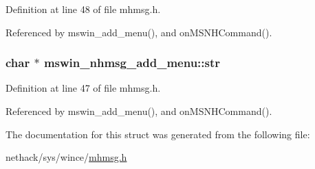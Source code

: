 Definition at line 48 of file mhmsg.\+h.



Referenced by mswin\+\_\+add\+\_\+menu(), and on\+M\+S\+N\+H\+Command().

\hypertarget{structmswin__nhmsg__add__menu_affef89042e33c9d34265eadc957330d6}{
\subsubsection[{str}]{ char $\ast$ mswin\+\_\+nhmsg\+\_\+add\+\_\+menu\+::str}}\label{structmswin__nhmsg__add__menu_affef89042e33c9d34265eadc957330d6}


Definition at line 47 of file mhmsg.\+h.



Referenced by mswin\+\_\+add\+\_\+menu(), and on\+M\+S\+N\+H\+Command().



The documentation for this struct was generated from the following file\+:\begin{DoxyCompactItemize}
\item 
nethack/sys/wince/\hyperlink{sys_2wince_2mhmsg_8h}{mhmsg.\+h}\end{DoxyCompactItemize}
